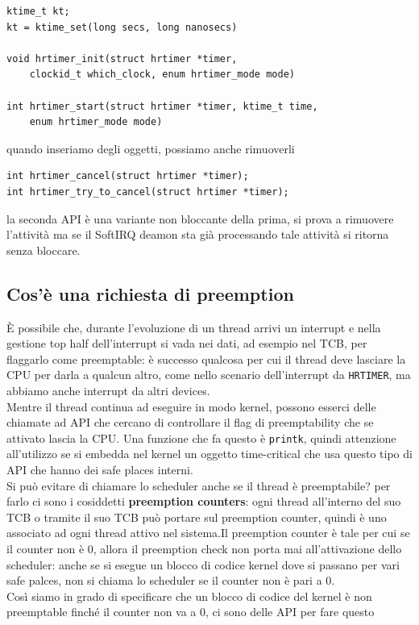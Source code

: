 \documentclass[12pt, oneside]{extbook}
\begin{document}
\begin{lstlisting}
ktime_t kt;
kt = ktime_set(long secs, long nanosecs)

void hrtimer_init(struct hrtimer *timer, 
	clockid_t which_clock, enum hrtimer_mode mode)
	
int hrtimer_start(struct hrtimer *timer, ktime_t time, 
	enum hrtimer_mode mode)
\end{lstlisting}
quando inseriamo degli oggetti, possiamo anche rimuoverli
\begin{lstlisting}
int hrtimer_cancel(struct hrtimer *timer);
int hrtimer_try_to_cancel(struct hrtimer *timer);
\end{lstlisting}
la seconda API è una variante non bloccante della prima, si prova a rimuovere l'attività ma se il SoftIRQ deamon sta già processando tale attività si ritorna senza bloccare.
\subsection{Cos'è una richiesta di preemption}
È possibile che, durante l'evoluzione di un thread arrivi un interrupt e nella gestione top half dell'interrupt si vada nei dati, ad esempio nel TCB, per flaggarlo come preemptable: è successo qualcosa per cui il thread deve lasciare la CPU per darla a qualcun altro, come nello scenario dell'interrupt da \texttt{HRTIMER}, ma abbiamo anche interrupt da altri devices.\\Mentre il thread continua ad eseguire in modo  kernel, possono esserci delle chiamate ad API che cercano di controllare il flag di preemptability che se attivato lascia la CPU. Una funzione che fa questo è \texttt{printk}, quindi attenzione all'utilizzo se si embedda nel kernel un oggetto time-critical che usa questo tipo di API che hanno dei safe places interni.\\Si può evitare di chiamare lo scheduler anche se il thread è preemptabile? per farlo ci sono i cosiddetti \textbf{preemption counters}: ogni thread all'interno del suo TCB o tramite il suo TCB può portare sul preemption counter, quindi è uno associato ad ogni thread attivo nel sistema.Il preemption counter è tale per cui se il counter non è 0, allora il preemption check non porta mai all'attivazione dello scheduler: anche se si esegue un blocco di codice kernel dove si passano per vari safe palces, non si chiama lo scheduler se il counter non è pari a 0.\\Così siamo in grado di specificare che un blocco di codice del kernel è non preemptable finché il counter non va a 0, ci sono delle API per fare questo
\end{document}
